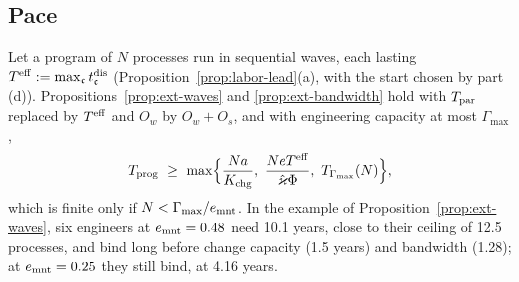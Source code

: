\subsection{Pace}\label{sec:labor-pace}

\begin{corollary}\label{cor:labor-pace}
Let a program of $N$ processes run in sequential waves, each lasting $T^{\rm eff}:=\max_{\mathfrak c}t^{\rm dis}_{\mathfrak c}$ (Proposition~\ref{prop:labor-lead}(a), with the start chosen by part (d)). Propositions~\ref{prop:ext-waves} and \ref{prop:ext-bandwidth} hold with $T_{\rm par}$ replaced by $T^{\rm eff}$ and $O_w$ by $O_w+O_s$, and with engineering capacity at most $\Gamma_{\max}$,
\[
T_{\rm prog}\ \ge\ \max\Bigl\{\frac{Na}{K_{\rm chg}},\ \frac{NeT^{\rm eff}}{\hat\varkappa\Phi},\ T_{\Gamma_{\max}}(N)\Bigr\},
\]
which is finite only if $N<\Gamma_{\max}/e_{\rm mnt}$. In the example of Proposition~\ref{prop:ext-waves}, six engineers at $e_{\rm mnt}=0.48$ need 10.1 years, close to their ceiling of 12.5 processes, and bind long before change capacity (1.5 years) and bandwidth (1.28); at $e_{\rm mnt}=0.25$ they still bind, at 4.16 years.
\end{corollary}

